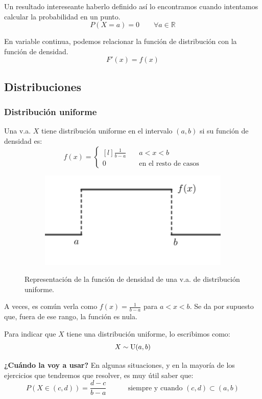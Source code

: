\documentclass[a4paper]{book}
\begin{document}
Un resultado intereseante haberlo definido así lo encontramos cuando intentamos calcular la probabilidad en un punto. \[P(X=a) = 0 \qquad \forall a \in \mathbb{R}\]

\begin{nota}
	En variable continua, podemos relacionar la función de distribución con la función de densidad.
	\[F'(x) = f(x)\]
\end{nota}


\subsection{Distribuciones}
\subsubsection{Distribución uniforme}
Una v.a. $X$ tiene distribución uniforme en el intervalo $(a,b)$ si su función de densidad es: \[f(x) = \left\{ \begin{matrix*}[l]
		\displaystyle{\frac{1}{b-a}} & \quad a<x<b\\[15pt]
		0 & \quad \text{en el resto de casos}
	\end{matrix*}\right.\]

\begin{figure}[h!]
	\begin{subfigure}[b]{\linewidth}
		\centering
		\includegraphics[width=0.4\linewidth]{./Imágenes/aaa.png}
	\end{subfigure}
	\caption{Representación de la función de densidad de una v.a. de distribución uniforme.}
\end{figure}

A veces, es común verla como $f(x) = \frac{1}{b-a}$ para $a<x<b$. Se da por supuesto que, fuera de ese rango, la función es nula.

Para indicar que $X$ tiene una distribución uniforme, lo escribimos como: \[X\sim \operatorname{U}(a,b)\]

\textbf{¿Cuándo la voy a usar?} En algunas situaciones, y en la mayoría de los ejercicios que tendremos que resolver, es muy útil saber que: \[P\left( X \in (c,d) \right)= \frac{d-c}{b-a} \qquad \quad \text{siempre y cuando }(c,d)\subset (a,b)\]
\end{document}
